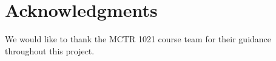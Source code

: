 \chapter*{Acknowledgments}
\label{chap:ack}
\pagestyle{plain}

We would like to thank the MCTR 1021 course team for their guidance throughout this project.
